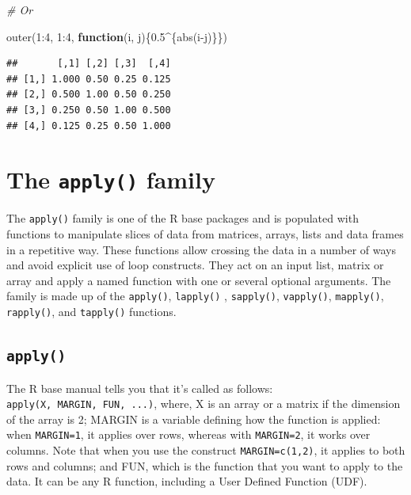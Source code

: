 \documentclass[
]{book}
\newenvironment{Shaded}{\begin{snugshade}}{\end{snugshade}}
\newcommand{\CommentTok}[1]{\textcolor[rgb]{0.56,0.35,0.01}{\textit{#1}}}
\newcommand{\ControlFlowTok}[1]{\textcolor[rgb]{0.13,0.29,0.53}{\textbf{#1}}}
\newcommand{\DecValTok}[1]{\textcolor[rgb]{0.00,0.00,0.81}{#1}}
\newcommand{\FloatTok}[1]{\textcolor[rgb]{0.00,0.00,0.81}{#1}}
\newcommand{\FunctionTok}[1]{\textcolor[rgb]{0.00,0.00,0.00}{#1}}
\newcommand{\NormalTok}[1]{#1}
\newcommand{\SpecialCharTok}[1]{\textcolor[rgb]{0.00,0.00,0.00}{#1}}
\theoremstyle{definition}
\theoremstyle{definition}
\theoremstyle{definition}
\theoremstyle{definition}
\theoremstyle{remark}
\begin{document}
\begin{Shaded}
\begin{Highlighting}[]
\CommentTok{\# Or}

\FunctionTok{outer}\NormalTok{(}\DecValTok{1}\SpecialCharTok{:}\DecValTok{4}\NormalTok{, }\DecValTok{1}\SpecialCharTok{:}\DecValTok{4}\NormalTok{, }\ControlFlowTok{function}\NormalTok{(i, j)\{}\FloatTok{0.5}\SpecialCharTok{\^{}}\NormalTok{\{}\FunctionTok{abs}\NormalTok{(i}\SpecialCharTok{{-}}\NormalTok{j)\}\})}
\end{Highlighting}
\end{Shaded}

\begin{verbatim}
##       [,1] [,2] [,3]  [,4]
## [1,] 1.000 0.50 0.25 0.125
## [2,] 0.500 1.00 0.50 0.250
## [3,] 0.250 0.50 1.00 0.500
## [4,] 0.125 0.25 0.50 1.000
\end{verbatim}

\hypertarget{the-apply-family}{%
\section{\texorpdfstring{The \texttt{apply()} family}{The apply() family}}\label{the-apply-family}}

The \texttt{apply()} family is one of the R base packages and is populated with functions to manipulate slices of data from matrices, arrays, lists and data frames in a repetitive way. These functions allow crossing the data in a number of ways and avoid explicit use of loop constructs. They act on an input list, matrix or array and apply a named function with one or several optional arguments. The family is made up of the \texttt{apply()}, \texttt{lapply()} , \texttt{sapply()}, \texttt{vapply()}, \texttt{mapply()}, \texttt{rapply()}, and \texttt{tapply()} functions.

\hypertarget{apply}{%
\subsection{\texorpdfstring{\texttt{apply()}}{apply()}}\label{apply}}

The R base manual tells you that it's called as follows: \texttt{apply(X,\ MARGIN,\ FUN,\ ...)}, where, X is an array or a matrix if the dimension of the array is 2; MARGIN is a variable defining how the function is applied: when \texttt{MARGIN=1}, it applies over rows, whereas with \texttt{MARGIN=2}, it works over columns. Note that when you use the construct \texttt{MARGIN=c(1,2)}, it applies to both rows and columns; and FUN, which is the function that you want to apply to the data. It can be any R function, including a User Defined Function (UDF).
\end{document}
